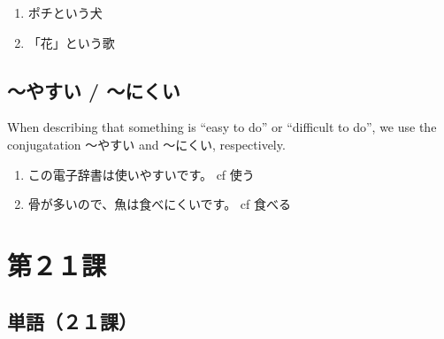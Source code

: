 \documentclass[notoc,notitlepage]{tufte-book}
\begin{document}
\begin{eg}
  \begin{enumerate}
    \item ポチという犬
    \item 「花」という歌
  \end{enumerate}
\end{eg}


\section{〜やすい / 〜にくい}%
\label{sec:_yasui_nikui}

When describing that something is ``easy to do'' or
``difficult to do'', we use the conjugatation
〜やすい and 〜にくい, respectively.

\begin{eg}
  \begin{enumerate}
    \item この電子辞書は使いやすいです。 cf 使う
    \item 骨が多いので、魚は食べにくいです。 cf 食べる
  \end{enumerate}
\end{eg}



\chapter{第２１課}%
\label{chp:dai_21_ka}

\section{単語（２１課）}%
\label{sec:tango_c21}
\end{document}
